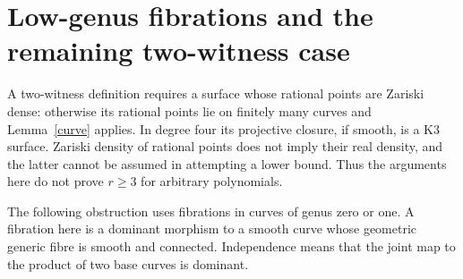 \documentclass[11pt]{article}
\theoremstyle{remark}\newtheorem{remark}[theorem]{Remark}
\begin{document}
\section{Low-genus fibrations and the remaining two-witness case}

A two-witness definition requires a surface whose rational points are Zariski dense: otherwise its rational points lie on finitely many curves and Lemma~\ref{curve} applies. In degree four its projective closure, if smooth, is a K3 surface. Zariski density of rational points does not imply their real density, and the latter cannot be assumed in attempting a lower bound. Thus the arguments here do not prove \(r\ge3\) for arbitrary polynomials.

The following obstruction uses fibrations in curves of genus zero or one. A fibration here is a dominant morphism to a smooth curve whose geometric generic fibre is smooth and connected. Independence means that the joint map to the product of two base curves is dominant.
\end{document}
